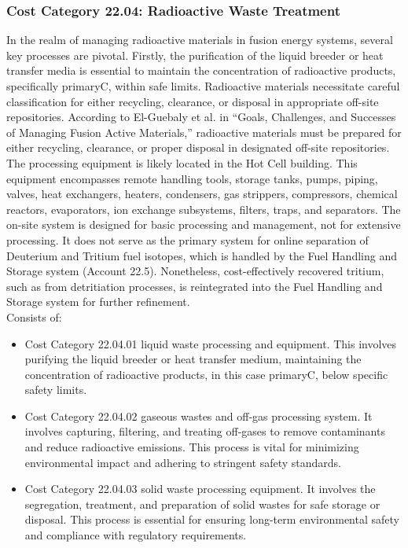 
\subsubsection{Cost Category 22.04: Radioactive Waste Treatment} 
In the realm of managing radioactive materials in fusion energy systems, several key processes are pivotal. Firstly, the purification of the liquid breeder or heat transfer media is essential to maintain the concentration of radioactive products, specifically primaryC, within safe limits.  Radioactive materials necessitate careful classification for either recycling, clearance, or disposal in appropriate off-site repositories.  According to El-Guebaly et al. in “Goals, Challenges, and Successes of Managing Fusion Active Materials,” \cite{Elguebaly} radioactive materials must be prepared for either recycling, clearance, or proper disposal in designated off-site repositories.  The processing equipment is likely located in the Hot Cell building. This equipment encompasses remote handling tools, storage tanks, pumps, piping, valves, heat exchangers, heaters, condensers, gas strippers, compressors, chemical reactors, evaporators, ion exchange subsystems, filters, traps, and separators.  The on-site system is designed for basic processing and management, not for extensive processing. It does not serve as the primary system for online separation of Deuterium and Tritium fuel isotopes, which is handled by the Fuel Handling and Storage system (Account 22.5). Nonetheless, cost-effectively recovered tritium, such as from detritiation processes, is reintegrated into the Fuel Handling and Storage system for further refinement.\\

Consists of: 

\begin{itemize}
\item Cost Category 22.04.01 liquid waste processing and equipment.  This involves purifying the liquid breeder or heat transfer medium,  maintaining the concentration of radioactive products, in this case primaryC, below specific safety limits.
\item Cost Category 22.04.02 gaseous wastes and off-gas processing system. It involves capturing, filtering, and treating off-gases to remove contaminants and reduce radioactive emissions. This process is vital for minimizing environmental impact and adhering to stringent safety standards.
\item Cost Category 22.04.03 solid waste processing equipment. It involves the segregation, treatment, and preparation of solid wastes for safe storage or disposal. This process is essential for ensuring long-term environmental safety and compliance with regulatory requirements.
\end{itemize}




